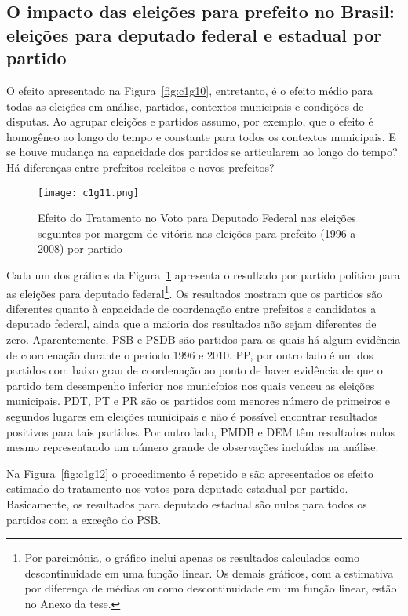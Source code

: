 \subsection{O impacto das eleições para prefeito no Brasil: eleições para deputado federal e estadual por partido}

O efeito apresentado na Figura~\ref{fig:c1g10}, entretanto, é o efeito médio para todas as eleições em análise, partidos, contextos municipais e condições de disputas. Ao agrupar eleições e partidos assumo, por exemplo, que o efeito é homogêneo ao longo do tempo e constante para todos os contextos municipais. E se houve mudança na capacidade dos partidos se articularem ao longo do tempo? Há diferenças entre prefeitos reeleitos e novos prefeitos?


\begin{figure}[htp]
	\centering
	\texttt{[image: c1g11.png]}
	\caption{Efeito do Tratamento no Voto para Deputado Federal nas eleições seguintes por margem de vitória nas eleições para prefeito (1996 a 2008) por partido}
	\label{fig:c1g11} 
\end{figure}

Cada um dos gráficos da Figura~\ref{fig:c1g11} apresenta o resultado por partido político para as eleições para deputado federal\footnote {Por parcimônia, o gráfico inclui apenas os resultados calculados como descontinuidade em uma função linear. Os demais gráficos, com a estimativa por diferença de médias ou como descontinuidade em um função linear, estão no Anexo da tese.}. Os resultados mostram que os partidos são diferentes quanto à capacidade de coordenação entre prefeitos e candidatos a deputado federal, ainda que a maioria dos resultados não sejam diferentes de zero. Aparentemente, PSB e PSDB são partidos para os quais há algum evidência de coordenação durante o período 1996 e 2010. PP, por outro lado é um dos partidos com baixo grau de coordenação ao ponto de haver evidência de que o partido tem desempenho inferior nos municípios nos quais venceu as eleições municipais. PDT, PT e PR são os partidos com menores número de primeiros e segundos lugares em eleições municipais e não é possível encontrar resultados positivos para tais partidos. Por outro lado, PMDB e DEM têm resultados nulos mesmo representando um número grande de observações incluídas na análise.

Na Figura~\ref{fig:c1g12} o procedimento é repetido e são apresentados os efeito estimado do tratamento nos votos para deputado estadual por partido. Basicamente, os resultados para deputado estadual são nulos para todos os partidos com a exceção do PSB.

